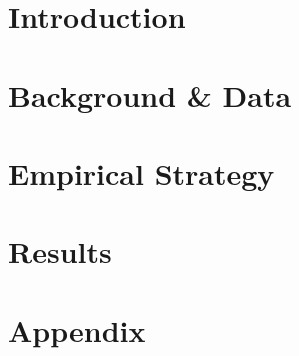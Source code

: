 \documentclass[12pt]{article}
\begin{document}
\doublespacing

% 

\section{Introduction} \label{sec:introduction}



   
 \label{sec:lit_review}

\section{Background \& Data} \label{sec:data}



\section{Empirical Strategy} \label{sec:empirical}



\section{Results} \label{sec:result}





\singlespacing
\setlength\bibsep{12pt}

% 



\clearpage

\appendix
\section*{Appendix} \label{sec:appendix}

\end{document}
